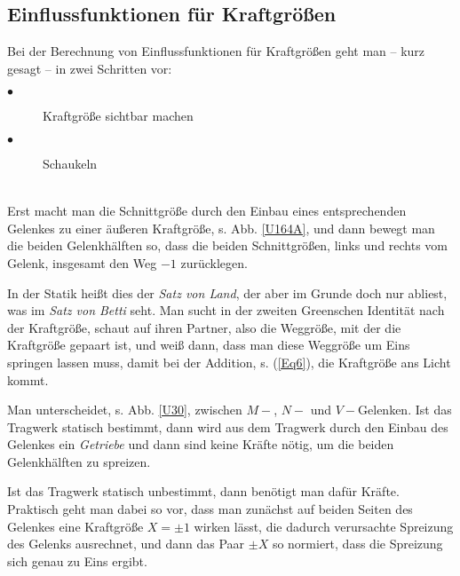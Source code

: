 {\textcolor{sectionTitleBlue}{\section{Einflussfunktionen f\"{u}r Kraftgr\"{o}{\ss}en}}}

Bei der Berechnung von Einflussfunktionen f\"{u}r Kraftgr\"{o}{\ss}en geht man -- kurz gesagt -- in zwei Schritten vor:\\

\colorbox{highlightBlue}{\parbox{0.5\textwidth}{
\begin{description}
  \item[$\bullet$] Kraftgr\"{o}{\ss}e sichtbar machen
  \item[$\bullet$] Schaukeln
\end{description}}}\\

Erst macht man die Schnittgr\"{o}{\ss}e durch den Einbau eines entsprechenden Gelenkes zu einer \"{a}u{\ss}eren Kraftgr\"{o}{\ss}e, s. Abb. \ref{U164A}, und dann bewegt man die beiden Gelenkh\"{a}lften so, dass die beiden Schnittgr\"{o}{\ss}en, links und rechts  vom Gelenk, insgesamt den Weg $-1$ zur\"{u}cklegen.

In der Statik hei{\ss}t dies der {\em Satz von Land\/}, der aber im Grunde doch nur abliest, was im {\em Satz von Betti\/} seht. Man sucht in der zweiten Greenschen Identit\"{a}t nach der Kraftgr\"{o}{\ss}e, schaut auf ihren Partner, also die Weggr\"{o}{\ss}e, mit der die Kraftgr\"{o}{\ss}e gepaart ist, und wei{\ss} dann, dass man diese Weggr\"{o}{\ss}e um Eins springen lassen muss, damit bei der Addition, s. (\ref{Eq6}), die Kraftgr\"{o}{\ss}e \glq ans Licht kommt\grq{}.

Man unterscheidet, s. Abb. \ref{U30}, zwischen $M-$, $N-$ und $V-$Gelenken. Ist das Tragwerk statisch bestimmt, dann wird aus dem Tragwerk durch den Einbau des Gelenkes ein {\em Getriebe\/} und dann sind keine Kr\"{a}fte n\"{o}tig, um die beiden Gelenkh\"{a}lften zu spreizen.

Ist das Tragwerk statisch unbestimmt, dann ben\"{o}tigt man daf\"{u}r Kr\"{a}fte. Praktisch geht man dabei so vor, dass  man zun\"{a}chst auf beiden Seiten des Gelenkes eine Kraftgr\"{o}{\ss}e $X = \pm 1$ wirken l\"{a}sst, die dadurch verursachte Spreizung des Gelenks ausrechnet, und dann das Paar $\pm X$ so normiert, dass die Spreizung sich genau zu Eins ergibt.


